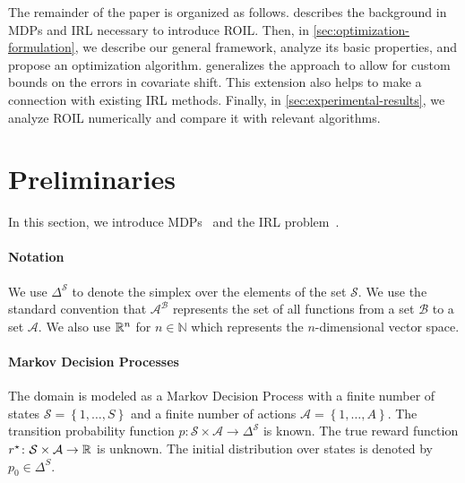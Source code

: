 \documentclass[11pt]{uai2023}
\begin{document}

The remainder of the paper is organized as follows.  describes the background in MDPs and IRL necessary to introduce ROIL. Then, in \cref{sec:optimization-formulation}, we describe our general framework, analyze its basic properties, and propose an optimization algorithm.  generalizes the approach to allow for custom bounds on the errors in covariate shift. This extension also helps to make a connection with existing IRL methods. Finally, in \cref{sec:experimental-results}, we analyze ROIL numerically and compare it with relevant algorithms. 

\section{Preliminaries}\label{sec:preliminaries}

In this section, we introduce MDPs~\cite{Puterman1994} and the IRL problem~\cite{abbeel2004,Syed2008,Ho2016}. 

\paragraph{Notation} We use $\Delta^{\mathcal{S}}$ to denote the simplex over the elements of the set $\mathcal{S}$. We use the standard convention that $\mathcal{A}^{\mathcal{B}}$ represents the set of all functions from a set $\mathcal{B}$ to a set $\mathcal{A}$. We also use $\mathbb{R}^n$ for $n\in \mathbb{N}$ which represents the $n$-dimensional vector space. 



\paragraph{Markov Decision Processes}
The domain is modeled as a Markov Decision Process with a finite number of states $\mathcal{S} = \left\{ 1, \dots , S \right\}$ and a finite number of actions $\mathcal{A} = \left\{ 1, \dots , A \right\}$. The transition probability function $p\colon \mathcal{S} \times \mathcal{A} \to \Delta^{\mathcal{S}}$ is known. The true reward function $r^{\mathnormal{\star}} \colon \mathcal{S} \times \mathcal{A} \to \mathbb{R}$ is unknown. The initial distribution over states is denoted by $p_0\in \Delta^S$.
\end{document}

